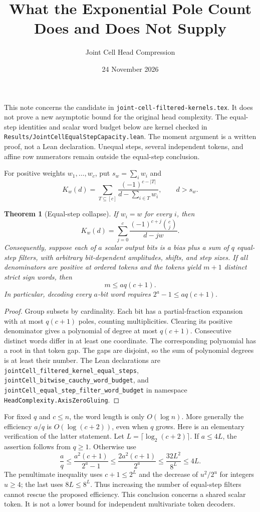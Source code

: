 \documentclass[11pt]{article}
\title{What the Exponential Pole Count Does and Does Not Supply}
\author{Joint Cell Head Compression}
\date{24 November 2026}
\newtheorem{theorem}{Theorem}
\begin{document}
\maketitle

This note concerns the candidate in \texttt{joint-cell-filtered-kernels.tex}.
It does not prove a new asymptotic bound for the original head complexity.
The equal-step identities and scalar word budget below are kernel checked
in \texttt{Results/JointCellEqualStepCapacity.lean}. The moment argument is
a written proof, not a Lean declaration. Unequal steps, several independent
tokens, and affine row numerators remain outside the equal-step conclusion.

For positive weights $w_1,\ldots,w_c$, put $s_w=\sum_iw_i$ and
\[
 K_w(d)=\sum_{T\subseteq[c]}\frac{(-1)^{c-|T|}}{d-\sum_{i\in T}w_i},
 \qquad d>s_w.
\]

\begin{theorem}[Equal-step collapse]
If $w_i=w$ for every $i$, then
\[
 K_w(d)=\sum_{j=0}^c\frac{(-1)^{c+j}\binom cj}{d-jw}.
\]
Consequently, suppose each of $a$ scalar output bits is a bias plus a sum
of $q$ equal-step filters, with arbitrary bit-dependent amplitudes, shifts,
and step sizes. If all denominators are positive at ordered tokens and the
tokens yield $m+1$ distinct strict sign words, then
\[
 m\leq aq(c+1).
\]
In particular, decoding every $a$-bit word requires
$2^a-1\leq aq(c+1)$.
\end{theorem}

\begin{proof}
Group subsets by cardinality. Each bit has a partial-fraction expansion
with at most $q(c+1)$ poles, counting multiplicities. Clearing its positive
denominator gives a polynomial of degree at most $q(c+1)$. Consecutive
distinct words differ in at least one coordinate. The corresponding
polynomial has a root in that token gap. The gaps are disjoint, so the sum
of polynomial degrees is at least their number. The Lean declarations are
\texttt{jointCell\_filtered\_kernel\_equal\_steps},
\texttt{jointCell\_bitwise\_cauchy\_word\_budget}, and
\texttt{jointCell\_equal\_step\_filter\_word\_budget} in namespace
\texttt{HeadComplexity.AxisZeroGluing}.
\end{proof}

For fixed $q$ and $c\leq n$, the word length is only $O(\log n)$.
More generally the efficiency $a/q$ is $O(\log(c+2))$, even when $q$ grows.
Here is an elementary verification of the latter statement. Let
$L=\lceil\log_2(c+2)\rceil$. If $a\leq4L$, the assertion follows from
$q\geq1$. Otherwise use
\[
 \frac aq\leq\frac{a^2(c+1)}{2^a-1}
 \leq\frac{2a^2(c+1)}{2^a}
 \leq\frac{32L^2}{8^L}\leq4L.
\]
The penultimate inequality uses $c+1\leq2^L$ and the decrease of
$u^2/2^u$ for integers $u\geq4$; the last uses $8L\leq8^L$.
Thus increasing the number of equal-step filters cannot rescue the
proposed efficiency. This conclusion concerns a shared scalar token.
It is not a lower bound for independent multivariate token decoders.
\end{document}
